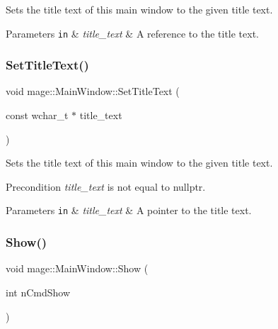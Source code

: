 Sets the title text of this main window to the given title text.


\begin{DoxyParams}[1]{Parameters}
\mbox{\tt in}  & {\em title\+\_\+text} & A reference to the title text. \\
\hline
\end{DoxyParams}
\hypertarget{classmage_1_1_main_window_aa86cdd0cd0f7345270ef88d72da446e2}{}\label{classmage_1_1_main_window_aa86cdd0cd0f7345270ef88d72da446e2} 
\subsubsection{\texorpdfstring{Set\+Title\+Text()}{SetTitleText()}\hspace{0.1cm}{\footnotesize\ttfamily [2/2]}}
{\footnotesize\ttfamily void mage\+::\+Main\+Window\+::\+Set\+Title\+Text (\begin{DoxyParamCaption}\item[{const wchar\+\_\+t $\ast$}]{title\+\_\+text }\end{DoxyParamCaption})}

Sets the title text of this main window to the given title text.

\begin{DoxyPrecond}{Precondition}
{\itshape title\+\_\+text} is not equal to {\ttfamily nullptr}. 
\end{DoxyPrecond}

\begin{DoxyParams}[1]{Parameters}
\mbox{\tt in}  & {\em title\+\_\+text} & A pointer to the title text. \\
\hline
\end{DoxyParams}
\hypertarget{classmage_1_1_main_window_a7e15913e45eeea42aace7f7ca96b25ec}{}\label{classmage_1_1_main_window_a7e15913e45eeea42aace7f7ca96b25ec} 
\subsubsection{\texorpdfstring{Show()}{Show()}}
{\footnotesize\ttfamily void mage\+::\+Main\+Window\+::\+Show (\begin{DoxyParamCaption}\item[{int}]{n\+Cmd\+Show }\end{DoxyParamCaption})}

